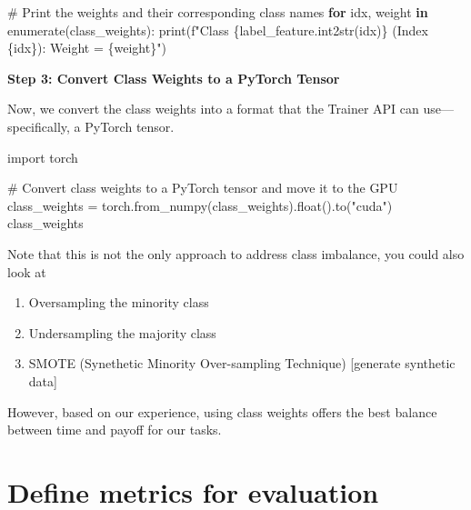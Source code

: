 \documentclass[
  letterpaper,
  DIV=11,
  numbers=noendperiod]{scrreprt}
\newenvironment{Shaded}{\begin{snugshade}}{\end{snugshade}}
\newcommand{\BuiltInTok}[1]{\textcolor[rgb]{0.00,0.23,0.31}{#1}}
\newcommand{\CommentTok}[1]{\textcolor[rgb]{0.37,0.37,0.37}{#1}}
\newcommand{\ControlFlowTok}[1]{\textcolor[rgb]{0.00,0.23,0.31}{\textbf{#1}}}
\newcommand{\ImportTok}[1]{\textcolor[rgb]{0.00,0.46,0.62}{#1}}
\newcommand{\KeywordTok}[1]{\textcolor[rgb]{0.00,0.23,0.31}{\textbf{#1}}}
\newcommand{\NormalTok}[1]{\textcolor[rgb]{0.00,0.23,0.31}{#1}}
\newcommand{\OperatorTok}[1]{\textcolor[rgb]{0.37,0.37,0.37}{#1}}
\newcommand{\SpecialCharTok}[1]{\textcolor[rgb]{0.37,0.37,0.37}{#1}}
\newcommand{\SpecialStringTok}[1]{\textcolor[rgb]{0.13,0.47,0.30}{#1}}
\newcommand{\StringTok}[1]{\textcolor[rgb]{0.13,0.47,0.30}{#1}}
\providecommand{\tightlist}{%
  \setlength{\itemsep}{0pt}\setlength{\parskip}{0pt}}\usepackage{longtable,booktabs,array}
\begin{document}
\begin{tcolorbox}
\begin{Shaded}
\begin{Highlighting}[]
\CommentTok{\# Print the weights and their corresponding class names}
\ControlFlowTok{for}\NormalTok{ idx, weight }\KeywordTok{in} \BuiltInTok{enumerate}\NormalTok{(class\_weights):}
    \BuiltInTok{print}\NormalTok{(}\SpecialStringTok{f"Class }\SpecialCharTok{\{}\NormalTok{label\_feature}\SpecialCharTok{.}\NormalTok{int2str(idx)}\SpecialCharTok{\}}\SpecialStringTok{ (Index }\SpecialCharTok{\{}\NormalTok{idx}\SpecialCharTok{\}}\SpecialStringTok{): Weight = }\SpecialCharTok{\{}\NormalTok{weight}\SpecialCharTok{\}}\SpecialStringTok{"}\NormalTok{)}
\end{Highlighting}
\end{Shaded}

\textbf{Step 3: Convert Class Weights to a PyTorch Tensor}

Now, we convert the class weights into a format that the Trainer API can
use---specifically, a PyTorch tensor.

\begin{Shaded}
\begin{Highlighting}[]
\ImportTok{import}\NormalTok{ torch}

\CommentTok{\# Convert class weights to a PyTorch tensor and move it to the GPU}
\NormalTok{class\_weights }\OperatorTok{=}\NormalTok{ torch.from\_numpy(class\_weights).}\BuiltInTok{float}\NormalTok{().to(}\StringTok{"cuda"}\NormalTok{)}
\NormalTok{class\_weights}
\end{Highlighting}
\end{Shaded}

Note that this is not the only approach to address class imbalance, you
could also look at

\begin{enumerate}
\def\labelenumi{\arabic{enumi}.}
\tightlist
\item
  Oversampling the minority class
\item
  Undersampling the majority class
\item
  SMOTE (Synethetic Minority Over-sampling Technique) {[}generate
  synthetic data{]}
\end{enumerate}

However, based on our experience, using class weights offers the best
balance between time and payoff for our tasks.

\end{tcolorbox}

\section{Define metrics for
evaluation}\label{define-metrics-for-evaluation-1}
\end{document}
